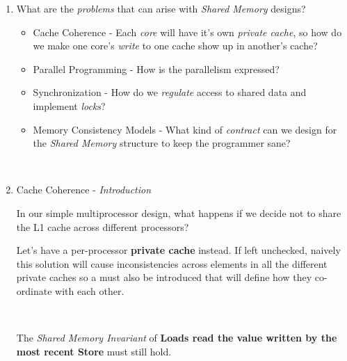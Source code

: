 \documentclass[12pt]{article}
\newenvironment{QandA}{\begin{enumerate}[label=\bfseries\arabic*.]\bfseries}
                      {\end{enumerate}}
\newenvironment{answered}{\par\quad\normalfont}{}
\begin{document}
\begin{QandA}
\begin{answered}
The main invariant here is: 

\quad \textit{LOADs must return the value written by the most recent STORE}
\end{answered}

\ 

\item What are the \textit{problems} that can arise with \textit{Shared Memory} designs?
\begin{answered}
\vspace{-0.85cm}
\begin{itemize}
    \item Cache Coherence - Each \textit{core} will have it's own \textit{private cache}, so how do we make one core's \textit{write} to one cache show up in another's cache?
    \item Parallel Programming - How is the parallelism expressed?
    \item Synchronization - How do we \textit{regulate} access to shared data and implement \textit{locks}?
    \item Memory Consistency Models - What kind of \textit{contract} can we design for the \textit{Shared Memory} structure to keep the programmer sane?
\end{itemize}
\end{answered}

\

\item Cache Coherence - \textit{Introduction}
\begin{answered}
In our simple multiprocessor design, what happens if we decide not to share the L1 cache across different processors? 

Let's have a per-processor \textbf{private cache} instead. If left unchecked, naively this solution will cause inconsistencies across elements in all the different private caches so a  must also be introduced that will define how they co-ordinate with each other. 

\ 

The \textit{Shared Memory Invariant} of \textbf{Loads read the value written by the most recent Store} must still hold.

\newpage 


\end{answered}
\end{QandA}
\end{document}
